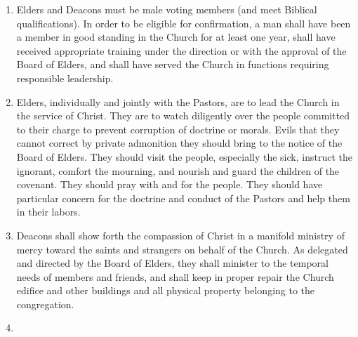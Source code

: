 \documentclass[
]{book}
\begin{document}
\begin{enumerate}
\def\labelenumi{\alph{enumi}.}
\item
  Elders and Deacons must be male voting members (and meet Biblical qualifications). In order to be eligible for confirmation, a man shall have been a member in good standing in the Church for at least one year, shall have received appropriate training under the direction or with the approval of the Board of Elders, and shall have served the Church in functions requiring responsible leadership.
\item
  Elders, individually and jointly with the Pastors, are to lead the Church in the service of Christ. They are to watch diligently over the people committed to their charge to prevent corruption of doctrine or morals. Evils that they cannot correct by private admoni­tion they should bring to the notice of the Board of Elders. They should visit the people, especially the sick, instruct the ignorant, comfort the mourning, and nourish and guard the children of the covenant. They should pray with and for the people. They should have particular concern for the doctrine and conduct of the Pastors and help them in their labors.
\item
  Deacons shall show forth the compassion of Christ in a manifold ministry of mercy toward the saints and strangers on behalf of the Church. As delegated and directed by the Board of Elders, they shall minister to the temporal needs of members and friends, and shall keep in proper repair the Church edifice and other buildings and all physical property belonging to the congregation.
\item

\end{enumerate}
\end{document}
